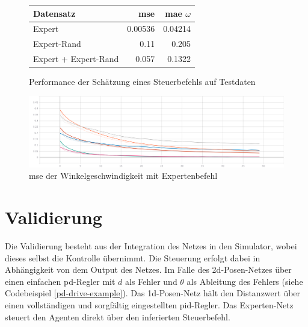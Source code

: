 \begin{figure}[H]
	\centering
	\begin{tabular}[t]{|l|r|r|}
		\hline
		\textbf{Datensatz} & \textbf{\acs{mse}} & \textbf{\acs{mae}} $\omega$ \\
		\hline
		Expert & 0.00536 & 0.04214 \\
		\hline
		Expert-Rand & 0.11 & 0.205 \\
		\hline
		Expert + Expert-Rand & 0.057 & 0.1322 \\
		\hline
	\end{tabular}
	\caption{Performance der Schätzung eines Steuerbefehls auf Testdaten}
	\label{expert-performance}
\end{figure}

\begin{figure}[H]
	\centering
	\includegraphics[width=\linewidth]{kapitel5/images/tensorboard/expert/Loss-expert.png}
	\caption{\acs{mse} der Winkelgeschwindigkeit mit Expertenbefehl}
	\label{expert-mse-omega}
\end{figure}


\section{Validierung}

Die Validierung besteht aus der Integration des Netzes in den Simulator, wobei dieses selbst die Kontrolle übernimmt. Die Steuerung erfolgt dabei in Abhängigkeit von dem Output des Netzes. Im Falle des \acs{2d}-Posen-Netzes über einen einfachen \acs{pd}-Regler mit $d$ als Fehler und $\theta$ als Ableitung des Fehlers (siehe Codebeispiel \ref{pd-drive-example}). Das \acs{1d}-Posen-Netz hält den Distanzwert über einen vollständigen und sorgfältig eingestellten \acs{pid}-Regler. Das Experten-Netz steuert den Agenten direkt über den inferierten Steuerbefehl.

